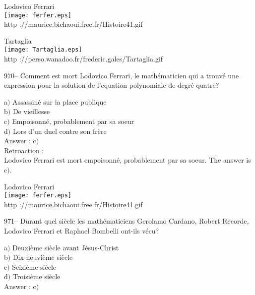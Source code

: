 ﻿\documentclass[letterpaper, 12pt]{article}
\begin{document}
        \begin{center}
        Lodovico Ferrari\\
    \texttt{[image: ferfer.eps]}\\
        {\footnotesize http ://maurice.bichaoui.free.fr/Histoire41.gif}
    \end{center}

        \begin{center}
        Tartaglia\\
    \texttt{[image: Tartaglia.eps]}\\
        {\footnotesize http
://perso.wanadoo.fr/frederic.gales/Tartaglia.gif}
    \end{center}

970-- Comment est mort Lodovico Ferrari, le math\'ematicien qui a
trouv\'e une expression pour la solution de l'equation polynomiale
de degr\'e quatre?

a$)$ Assassin\'e sur la place publique \\
b$)$ De vieillesse  \\
c$)$ Empoisonn\'e, probablement par sa soeur \\
d$)$ Lors d'un duel contre son fr\`ere \\

Answer : c$)$\\

Retroaction : \\
Lodovico Ferrari est mort empoisonn\'e, probablement par sa soeur.
The answer is c$)$.

        \begin{center}
        Lodovico Ferrari\\
    \texttt{[image: ferfer.eps]}\\
        {\footnotesize http ://maurice.bichaoui.free.fr/Histoire41.gif}
    \end{center}

971-- Durant quel si\`ecle les math\'ematiciens Gerolamo Cardano,
Robert Recorde, Lodovico Ferrari et Raphael Bombelli ont-ils v\'ecu?

a$)$ Deuxi\`eme si\`ecle avant J\'esus-Christ \\
b$)$ Dix-neuvi\`eme si\`ecle \\
c$)$ Seizi\`eme si\`ecle  \\
d$)$ Troisi\`eme si\`ecle \\

Answer : c$)$\\
\end{document}
